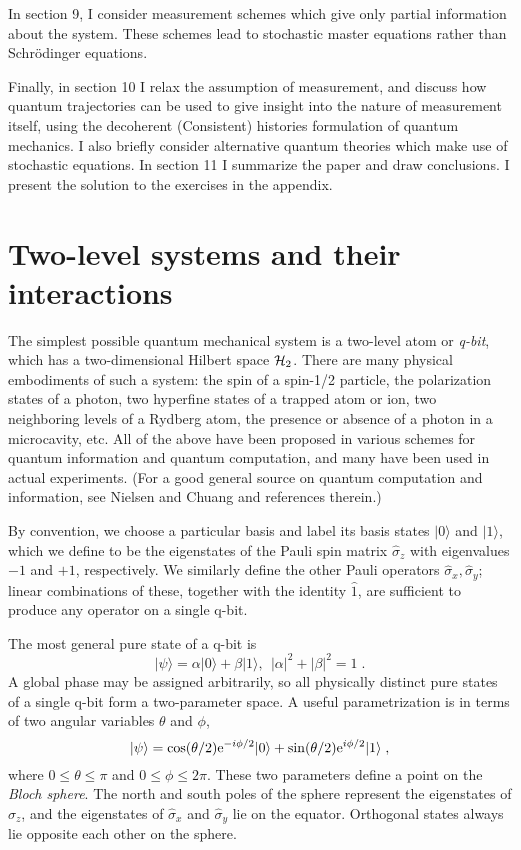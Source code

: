 \documentclass[12pt]{article}
\def\ket#1{{| #1 \rangle}}
\def\sx{{\hat\sigma_x}}
\def\sy{{\hat\sigma_y}}
\def\sz{{\hat\sigma_z}}
\def\id{{\hat 1}}
\def\e{{\rm e}}
\begin{document}
In section 9, I consider measurement schemes which give only partial
information about the system.  These schemes lead to stochastic master
equations rather than Schr\"odinger equations.

Finally, in section 10 I relax the assumption of measurement, and discuss
how quantum trajectories can be used to give insight into the nature of
measurement itself, using the decoherent (Consistent) histories formulation
of quantum mechanics.  I also briefly consider alternative quantum theories
which make use of stochastic equations.  In section 11 I summarize the paper
and draw conclusions.  I present the solution to the exercises in the
appendix.

\section{Two-level systems and their interactions}

The simplest possible quantum mechanical system is a two-level atom or
{\it q-bit}, which has a two-dimensional Hilbert space ${\cal H}_2$.
There are many physical embodiments of such a system:  the spin of a
spin-1/2 particle, the polarization states of a photon, two hyperfine
states of a trapped atom or ion, two neighboring levels of a Rydberg atom,
the presence or absence of a photon in a microcavity, etc.  All of the
above have been proposed in various schemes for quantum information and
quantum computation, and many have been used in actual
experiments.  (For a good general source on quantum computation and
information, see Nielsen and Chuang \cite{NielsenChuang} and
references therein.)

By convention, we choose a particular basis and label its basis states
$\ket0$ and $\ket1$, which we define to be the eigenstates of the Pauli
spin matrix $\sz$ with eigenvalues $-1$ and $+1$, respectively.
We similarly define the other Pauli operators $\sx,\sy$; linear combinations
of these, together with the identity $\id$, are sufficient to produce any
operator on a single q-bit.

The most general pure state of a q-bit is
\begin{equation}
\ket\psi = \alpha\ket0 + \beta\ket1,\ \ |\alpha|^2 + |\beta|^2 = 1 \;.
\label{qbit_pure}
\end{equation}
A global phase may be assigned arbitrarily, so all physically distinct
pure states of a single q-bit form a two-parameter space.
A useful parametrization is in terms of two angular variables
$\theta$ and $\phi$,
\begin{equation}
\ket\psi = \cos(\theta/2)\e^{-i\phi/2} \ket0
  + \sin(\theta/2)\e^{i\phi/2} \ket1 \;,
\label{pure_param}
\end{equation}
where $0 \le \theta \le \pi$ and $0 \le \phi \le 2\pi$.  These two
parameters define a point on the {\it Bloch sphere}.  The north
and south poles of the sphere represent the eigenstates of $\sz$, and
the eigenstates of $\sx$ and $\sy$ lie on the equator.  Orthogonal states
always lie opposite each other on the sphere.
\end{document}
